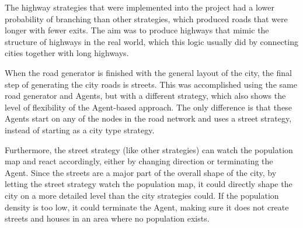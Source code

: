 The highway strategies that were implemented into the project had a lower probability of branching than other strategies, which produced roads that were longer with fewer exits.
The aim was to produce highways that mimic the structure of highways in the real world, which this logic usually did by connecting cities together with long highways.

When the road generator is finished with the general layout of the city, the final step of generating the city roads is streets.
This was accomplished using the same road generator and Agents, but with a different strategy, which also shows the level of flexibility of the Agent-based approach.
The only difference is that these Agents start on any of the nodes in the road network and uses a street strategy, instead of starting as a city type strategy.

Furthermore, the street strategy (like other strategies) can watch the population map and react accordingly, either by changing direction or terminating the Agent.
Since the streets are a major part of the overall shape of the city, by letting the street strategy watch the population map, it could directly shape the city on a more detailed level than the city strategies could.
If the population density is too low, it could terminate the Agent, making sure it does not create streets and houses in an area where no population exists.
